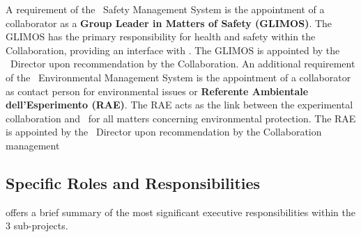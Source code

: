 A requirement of the \LNGS\ Safety Management System is the appointment of a collaborator as a {\bf Group Leader in Matters of Safety (GLIMOS)}. The GLIMOS has the primary responsibility for health and safety within the Collaboration, providing an interface with \LNGS.  The GLIMOS is appointed by the \LNGS\ Director upon recommendation by the Collaboration.  An additional requirement of the \LNGS\ Environmental Management System is the appointment of a collaborator as contact person for environmental issues or {\bf Referente Ambientale dell'Esperimento (RAE)}.  The RAE acts as the link between the experimental collaboration and \LNGS\ for all matters concerning environmental protection.  The RAE is appointed by the \LNGS\ Director upon recommendation by the Collaboration management

\subsection{Specific Roles and Responsibilities}
\label{sec:Organization-RolesResponsibilities}

 offers a brief summary of the most significant executive responsibilities within the 3 sub-projects.

